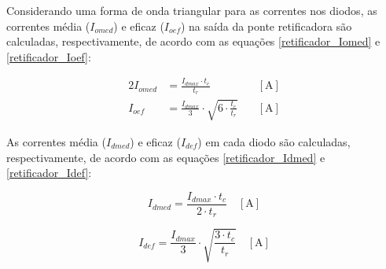 \begin{apendicesenv}

    
Considerando uma forma de onda triangular para as correntes nos diodos, as correntes média ($I_{omed}$) e eficaz ($I_{oef}$) na saída da ponte retificadora são calculadas, respectivamente, de acordo com as equações \ref{retificador_Iomed} e \ref{retificador_Ioef}:
    
    \begin{alignat}{2}
        I_{omed} & = \frac{I_{dmax} \cdot t_{c}}{t_{r}} \quad & [\text{A}]
        \label{retificador_Iomed} \\
         I_{oef} & = \frac{I_{dmax}}{3} \cdot \sqrt{6 \cdot \frac{t_{c}}{t_{r}}} \quad & [\text{A}]
        \label{retificador_Ioef}
    \end{alignat}
    
    
    
As correntes média ($I_{dmed}$) e eficaz ($I_{def}$) em cada diodo são calculadas, respectivamente, de acordo com as equações \ref{retificador_Idmed} e \ref{retificador_Idef}:
    
    \begin{equation}
        I_{dmed} = \frac{I_{dmax} \cdot t_{c}}{2 \cdot t_{r}} \quad [\text{A}]
        \label{retificador_Idmed}
    \end{equation}
    
    \begin{equation}
        I_{def} = \frac{I_{dmax}}{3} \cdot \sqrt{\frac{3 \cdot t_{c}}{t_{r}}} \quad [\text{A}]
        \label{retificador_Idef}
    \end{equation}


\end{apendicesenv}
